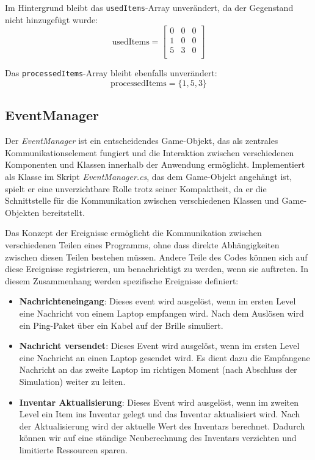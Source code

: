 Im Hintergrund bleibt das \texttt{usedItems}-Array unverändert, da der Gegenstand nicht hinzugefügt wurde:
\[
    \text{usedItems} =
    \left[
        \begin{array}{ccccc}
            0 & 0 & 0 \\
            1 & 0 & 0 \\
            5 & 3 & 0 \\
        \end{array}
        \right]
\]

Das \texttt{processedItems}-Array bleibt ebenfalls unverändert:
\[
    \text{processedItems} = \{1, 5, 3\}
\]

\subsection{EventManager} 

Der \textit{EventManager} ist ein entscheidendes Game-Objekt, das als zentrales Kommunikationselement fungiert und die
Interaktion zwischen verschiedenen Komponenten und Klassen innerhalb der Anwendung ermöglicht. Implementiert als Klasse
im Skript \textit{EventManager.cs}, das dem Game-Objekt angehängt ist, spielt er eine unverzichtbare Rolle trotz seiner
Kompaktheit, da er die Schnittstelle für die Kommunikation zwischen verschiedenen Klassen und Game-Objekten bereitstellt.

Das Konzept der Ereignisse ermöglicht die Kommunikation zwischen verschiedenen Teilen eines Programms, ohne dass direkte
Abhängigkeiten zwischen diesen Teilen bestehen müssen. Andere Teile des Codes können sich auf diese Ereignisse registrieren,
um benachrichtigt zu werden, wenn sie auftreten. In diesem Zusammenhang werden spezifische Ereignisse definiert:

\begin{itemize}
\item \textbf{Nachrichteneingang}: Dieses event wird ausgelöst, wenn im ersten Level eine Nachricht von einem Laptop
empfangen wird. Nach dem Auslösen wird ein Ping-Paket über ein Kabel auf der Brille simuliert.
\item \textbf{Nachricht versendet}: Dieses Event wird ausgelöst, wenn im ersten Level eine Nachricht an einen Laptop
gesendet wird. Es dient dazu die Empfangene Nachricht an das zweite Laptop im richtigen Moment (nach Abschluss der
Simulation) weiter zu leiten.
\item \textbf{Inventar Aktualisierung}: Dieses Event wird ausgelöst, wenn im zweiten Level ein Item ins Inventar gelegt und
das Inventar aktualisiert wird. Nach der Aktualisierung wird der aktuelle Wert des Inventars berechnet. Dadurch können
wir auf eine ständige Neuberechnung des Inventars verzichten und limitierte Ressourcen sparen.
\end{itemize}

